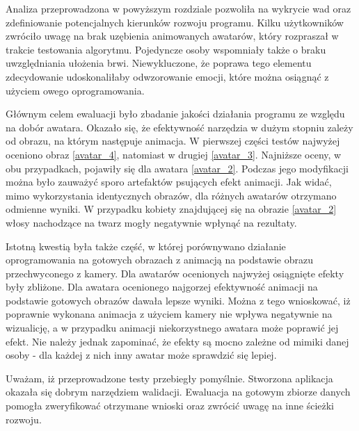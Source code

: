 Analiza przeprowadzona w powyższym rozdziale pozwoliła na wykrycie wad oraz zdefiniowanie potencjalnych kierunków rozwoju programu. Kilku użytkowników zwróciło uwagę na brak uzębienia animowanych awatarów, który rozpraszał w trakcie testowania algorytmu. Pojedyncze osoby wspomniały także o braku uwzględniania ułożenia brwi. Niewykluczone, że poprawa tego elementu zdecydowanie udoskonaliłaby odwzorowanie emocji, które można osiągnąć z użyciem owego oprogramowania.

Głównym celem ewaluacji było zbadanie jakości działania programu ze względu na dobór awatara. Okazało się, że efektywność narzędzia w dużym stopniu zależy od obrazu, na którym następuje animacja. W pierwszej części testów najwyżej oceniono obraz \ref{avatar_4}, natomiast w drugiej \ref{avatar_3}. Najniższe oceny, w obu przypadkach, pojawiły się dla awatara \ref{avatar_2}. Podczas jego modyfikacji można było zauważyć sporo artefaktów psujących efekt animacji. Jak widać, mimo wykorzystania identycznych obrazów, dla różnych awatarów otrzymano odmienne wyniki. W przypadku kobiety znajdującej się na obrazie \ref{avatar_2} włosy nachodzące na twarz mogły negatywnie wpłynąć na rezultaty.

Istotną kwestią była także część, w której porównywano działanie oprogramowania na gotowych obrazach z animacją na podstawie obrazu przechwyconego z kamery. Dla awatarów ocenionych najwyżej osiągnięte efekty były zbliżone. Dla awatara ocenionego najgorzej efektywność animacji na podstawie gotowych obrazów dawała lepsze wyniki. Można z tego wnioskować, iż poprawnie wykonana animacja z użyciem kamery nie wpływa negatywnie na wizualicję, a w przypadku animacji niekorzystnego awatara może poprawić jej efekt. Nie należy jednak zapominać, że efekty są mocno zależne od mimiki danej osoby - dla każdej z nich inny awatar może sprawdzić się lepiej. 

Uważam, iż przeprowadzone testy przebiegły pomyślnie. Stworzona aplikacja okazała się dobrym narzędziem walidacji. Ewaluacja na gotowym zbiorze danych pomogła zweryfikować otrzymane wnioski oraz zwrócić uwagę na inne ścieżki rozwoju.



